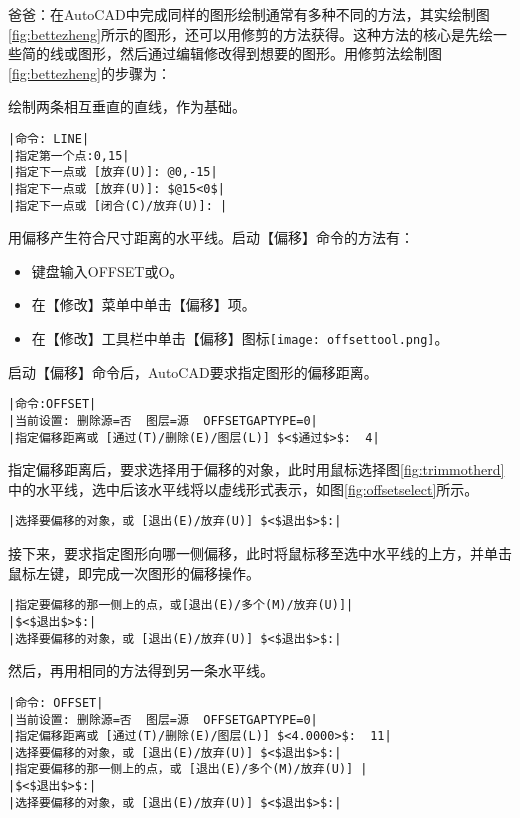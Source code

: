 爸爸：在AutoCAD中完成同样的图形绘制通常有多种不同的方法，其实绘制图\ref{fig:bettezheng}所示的图形，还可以用修剪的方法获得。这种方法的核心是先绘一些简的线或图形，然后通过编辑修改得到想要的图形。用修剪法绘制图\ref{fig:bettezheng}的步骤为：
\begin{procedure}
\item 绘制两条相互垂直的直线，作为基础。
\begin{lstlisting}
|命令: LINE|
|指定第一个点:0,15|
|指定下一点或 [放弃(U)]: @0,-15|
|指定下一点或 [放弃(U)]: $@15<0$|
|指定下一点或 [闭合(C)/放弃(U)]: |
\end{lstlisting}
\item 用偏移产生符合尺寸距离的水平线。启动【偏移】命令的方法有：
\begin{itemize}
\item 键盘输入OFFSET或O。
\item 在【修改】菜单中单击【偏移】项。
\item 在【修改】工具栏中单击【偏移】图标\texttt{[image: offsettool.png]}。
\end{itemize}
启动【偏移】命令后，AutoCAD要求指定图形的偏移距离。
\begin{lstlisting}
|命令:OFFSET|
|当前设置: 删除源=否  图层=源  OFFSETGAPTYPE=0|
|指定偏移距离或 [通过(T)/删除(E)/图层(L)] $<$通过$>$:  4|
\end{lstlisting}
指定偏移距离后，要求选择用于偏移的对象，此时用鼠标选择图\ref{fig:trimmotherd}中的水平线，选中后该水平线将以虚线形式表示，如图\ref{fig:offsetselect}所示。
\begin{lstlisting}
|选择要偏移的对象，或 [退出(E)/放弃(U)] $<$退出$>$:|
\end{lstlisting}
接下来，要求指定图形向哪一侧偏移，此时将鼠标移至选中水平线的上方，并单击鼠标左键，即完成一次图形的偏移操作。
\begin{lstlisting}
|指定要偏移的那一侧上的点，或[退出(E)/多个(M)/放弃(U)]|
|$<$退出$>$:|
|选择要偏移的对象，或 [退出(E)/放弃(U)] $<$退出$>$:|
\end{lstlisting}
然后，再用相同的方法得到另一条水平线。
\begin{lstlisting}
|命令: OFFSET|
|当前设置: 删除源=否  图层=源  OFFSETGAPTYPE=0|
|指定偏移距离或 [通过(T)/删除(E)/图层(L)] $<4.0000>$:  11|
|选择要偏移的对象，或 [退出(E)/放弃(U)] $<$退出$>$:|
|指定要偏移的那一侧上的点，或 [退出(E)/多个(M)/放弃(U)] |
|$<$退出$>$:|
|选择要偏移的对象，或 [退出(E)/放弃(U)] $<$退出$>$:|
\end{lstlisting}


\end{procedure}
